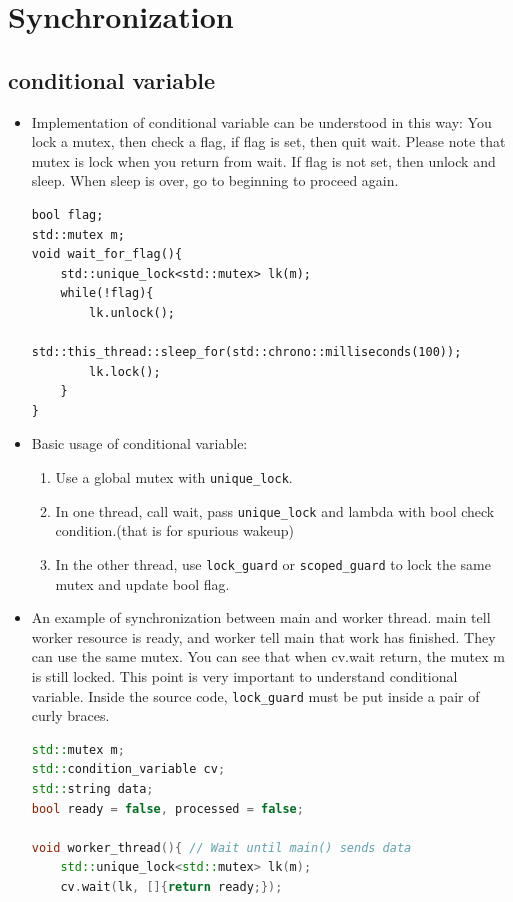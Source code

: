 \documentclass[a4paper,11pt,twoside]{book}
\begin{document}
\section{Synchronization}
\subsection{conditional variable}
\begin{itemize}
	    \item Implementation of conditional variable can be understood in this way: You lock a mutex, then check a flag, if flag is set, then quit wait. Please note that mutex is lock when you return from wait. If flag is not set, then unlock and sleep. When sleep is over, go to beginning to proceed again.
\begin{lstlisting}[]
bool flag;
std::mutex m;
void wait_for_flag(){
	std::unique_lock<std::mutex> lk(m);
	while(!flag){
		lk.unlock();
		std::this_thread::sleep_for(std::chrono::milliseconds(100));
		lk.lock();
	}
}	
\end{lstlisting}	
	
	\item Basic usage of conditional variable:

\begin{enumerate}
	\item Use a global mutex with \texttt{unique\_lock}.  
	\item In one thread, call wait, pass \texttt{unique\_lock} and lambda with bool check condition.(that is for spurious wakeup)
	\item In the other thread, use \texttt{lock\_guard} or \texttt{scoped\_guard} to lock the same mutex and update bool flag.
\end{enumerate}

\item An example of synchronization between main and worker thread. main tell worker resource is ready, and worker tell main that work has finished. They can use the same mutex. You can see that when cv.wait return, the mutex m is still locked. This point is very important to understand conditional variable.  Inside the source code, \texttt{lock\_guard} must be put inside a pair of curly braces. 

\begin{lstlisting}[frame=single, language=c++]
std::mutex m;
std::condition_variable cv;
std::string data;
bool ready = false, processed = false;

void worker_thread(){ // Wait until main() sends data
	std::unique_lock<std::mutex> lk(m);
	cv.wait(lk, []{return ready;});
	

\end{lstlisting}
\end{itemize}
\end{document}
